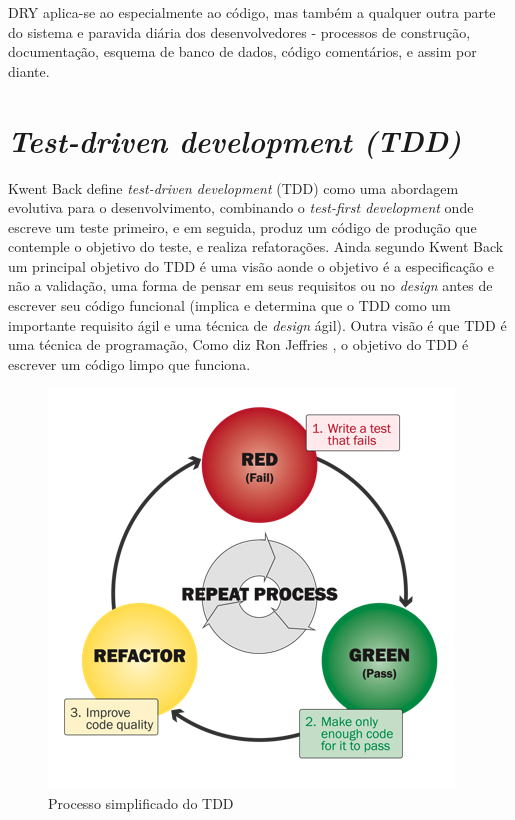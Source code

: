 \documentclass[12pt]{article}
\begin{document}
DRY aplica-se ao especialmente ao código, mas também a qualquer outra parte do sistema e paravida diária dos desenvolvedores - processos de construção, documentação, esquema de banco de dados, código comentários, e assim por diante.

\section{\textsl{Test-driven development (TDD)}} \label{sec:tdd}

Kwent Back \cite{TDD_EXAMPLE} define \textit{test-driven development} (TDD) como uma abordagem evolutiva para o desenvolvimento, combinando o \textit{test-first development } onde escreve um teste primeiro, e em seguida, produz um código de produção que contemple o objetivo do teste, e realiza refatorações. Ainda segundo Kwent Back um principal objetivo do TDD é uma visão aonde o objetivo é a especificação e não a validação, uma forma de pensar em seus requisitos ou no \textit{design} antes de escrever seu código funcional (implica e determina que o TDD como um importante requisito ágil e uma técnica de \textit{design} ágil). Outra visão é que TDD é uma técnica de programação, Como diz Ron Jeffries \cite{CLEAN_CODE_TOO_MUCH_OF_A_GOOD_THING}, o objetivo do TDD é escrever um código limpo que funciona.


\begin{figure}[h]
	\centering
		\includegraphics[scale=0.4]{img/tdd-simple-process.png}
	\caption{Processo simplificado do TDD}
	\label{fig:TDD-PROCESS}
\end{figure}
\end{document}
